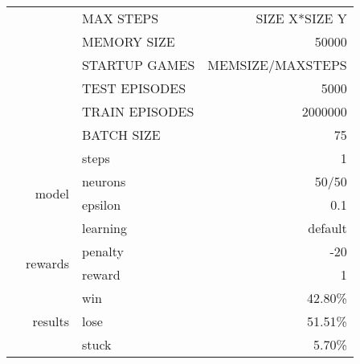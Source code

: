 \documentclass[9pt]{article}
\begin{document}
\begin{tabularx}{\textwidth}{l|r|X|r}
	& & MAX STEPS & SIZE X*SIZE Y\\
	& & MEMORY SIZE & 50000 \\
	& & STARTUP GAMES & MEMSIZE/MAXSTEPS \\
	& & TEST EPISODES & 5000 \\
	& & TRAIN EPISODES & 2000000 \\
	& & BATCH SIZE & 75 \\
	& & steps & 1\\\cline{2-4}
	& \multirow{2}{*}{model} & neurons & 50/50 \\ 
	& & epsilon & 0.1\\
	& & learning & default \\\cline{2-4}
	& \multirow{2}{*}{rewards} & penalty & -20\\
	& & reward& 1\\\cline{2-4}
	& \multirow{3}{*}{results} & win & 42.80\% \\
	& & lose & 51.51\% \\
	& & stuck & 5.70\% \\
	\hline
\end{tabularx}
\end{document}
